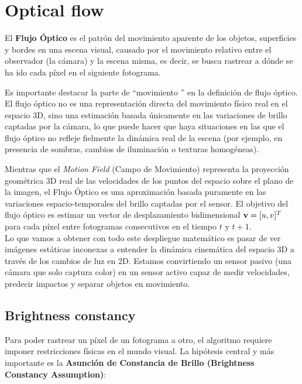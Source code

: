\chapter{Optical flow}

El \textbf{Flujo Óptico} es el patrón del movimiento aparente de los objetos, superficies y bordes en una escena visual, causado por el movimiento relativo entre el observador (la cámara) y la escena misma, es decir, se busca rastrear a dónde se ha ido cada píxel en el siguiente fotograma. \\

\begin{observacion}
    Es importante destacar la parte de ``movimiento '' en la definición de flujo óptico. El flujo óptico no es una representación directa del movimiento físico real en el espacio 3D, sino una estimación basada únicamente en las variaciones de brillo captadas por la cámara, lo que puede hacer que haya situaciones en las que el flujo óptico no refleje fielmente la dinámica real de la escena (por ejemplo, en presencia de sombras, cambios de iluminación o texturas homogéneas). \\
\end{observacion}

\noindent
Mientras que el \textit{Motion Field} (Campo de Movimiento) representa la proyección geométrica 3D real de las velocidades de los puntos del espacio sobre el plano de la imagen, el Flujo Óptico es una aproximación basada puramente en las variaciones espacio-temporales del brillo captadas por el sensor. El objetivo del flujo óptico es estimar un vector de desplazamiento bidimensional $\textbf{v} = [u, v]^T$ para cada píxel entre fotogramas consecutivos en el tiempo $t$ y $t+1$. \\

\noindent
Lo que vamos a obtener con todo este despliegue matemático es pasar de ver imágenes estáticas inconexas a entender la dinámica cinemática del espacio 3D a través de los cambios de luz en 2D. Estamos convirtiendo un sensor pasivo (una cámara que solo captura color) en un sensor activo capaz de medir velocidades, predecir impactos y separar objetos en movimiento.


\section{Brightness constancy}
Para poder rastrear un píxel de un fotograma a otro, el algoritmo requiere imponer restricciones físicas en el mundo visual. La hipótesis central y más importante es la \textbf{Asunción de Constancia de Brillo (Brightness Constancy Assumption)}:

